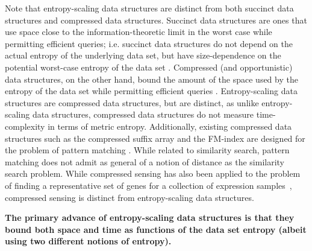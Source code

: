 \documentclass[review,preprint,12pt]{elsarticle}
\renewcommand{\cite}{\citep} %
\theoremstyle{definition}
\theoremstyle{remark}
\begin{document}
Note that entropy-scaling data structures are distinct from both succinct data structures and compressed data structures.
Succinct data structures are ones that use space close to the information-theoretic limit in the worst case while permitting efficient queries; i.e.
succinct data structures do not depend on the actual entropy of the underlying data set, but have size-dependence on the potential worst-case entropy of the data set \cite{jacobson1988succinct}.
Compressed (and opportunistic) data structures, on the other hand, bound the amount of the space used by the entropy of the data set while permitting efficient queries \cite{grossi2005compressed, ferragina2000opportunistic}.
Entropy-scaling data structures are compressed data structures, but are distinct, as
unlike entropy-scaling data structures, compressed data structures do not measure time-complexity in terms of metric entropy.
Additionally, existing compressed data structures such as the compressed suffix array and the FM-index are designed for the problem of pattern matching \cite{grossi2005compressed, ferragina2000opportunistic}.
While related to similarity search, pattern matching does not admit as general of a notion of distance as the similarity search problem.
While compressed sensing has also been applied to the problem of finding a representative set of genes for a collection of expression samples~\cite{prat2011recovering}, compressed sensing is distinct from entropy-scaling data structures.


\textbf{The primary advance of entropy-scaling data structures is that they bound both space and time as functions of the data set entropy (albeit using two different notions of entropy).}
\end{document}
